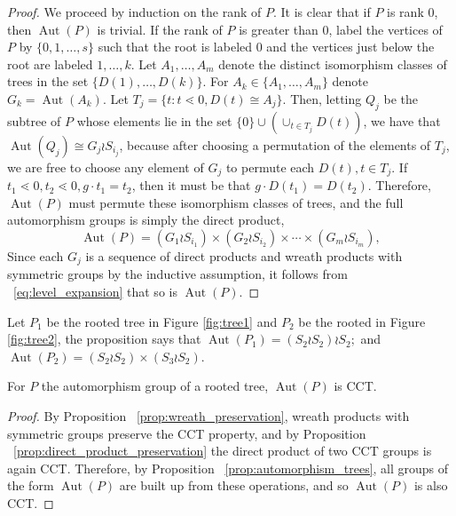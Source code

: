 \documentclass[smallextended]{svjour3}       %
\numberwithin{equation}{section}
\newcommand\Aut{\operatorname{Aut}}
\begin{document}
\begin{proof}
We proceed by induction on the rank of $P$.  It is clear that if $P$ is rank 0, then $\Aut(P)$ is trivial.  If the rank of $P$ is greater than 0, label the vertices of $P$ by $\{0,1,\ldots, s\}$ such that the root is labeled $0$ and the vertices just below the root are labeled $1, \ldots, k$. Let $A_1,\ldots, A_m$ denote the distinct isomorphism classes of trees in the set $\{D(1),\ldots, D(k)\}$. For $A_k \in \{A_1,\ldots,A_m\}$ denote $G_k = \Aut(A_k)$. 
Let $T_j = \{t\colon t\lessdot 0,D(t) \cong A_j\}$. Then, letting $Q_j$ be the subtree of $P$ whose elements lie in the set $\{0\} \cup (\cup_{t \in T_j} D(t))$, we have that $\Aut(Q_j) \cong G_j \wr S_{i_j}$, because after choosing a permutation of the elements of $T_j$, we are free to choose any element of $G_j$ to permute each $D(t),t \in T_j$. If $t_1 \lessdot 0,t_2 \lessdot 0,g \cdot t_1 = t_2$, then it must be that $g \cdot D(t_1) = D(t_2)$. Therefore, $\Aut(P)$ must permute these isomorphism classes of trees, and the full automorphism groups is simply the direct product, 
\begin{equation}
\label{eq:level_expansion}
\Aut(P) = (G_1 \wr S_{i_1}) \times (G_2 \wr S_{i_2}) \times \cdots \times (G_m\wr S_{i_m}),
\end{equation}
Since each $G_j$ is a sequence of direct products and wreath products with symmetric groups by the inductive assumption, it follows from ~\eqref{eq:level_expansion} that so is $\Aut(P)$.
\end{proof}

\begin{example}
Let $P_1$ be the rooted tree  in Figure \ref{fig:tree1} and $P_2$ be the rooted in Figure \ref{fig:tree2}, the proposition says that $\Aut (P_1) = (S_2 \wr S_2)\wr S_2;$ and $\Aut(P_2) = (S_2 \wr S_2) \times (S_3 \wr S_2) $. 
\end{example}

\begin{corollary}
\label{cor:tree_cct}
For $P$ the automorphism group of a rooted tree, $\Aut(P)$ is CCT.
\end{corollary}
\begin{proof}
By Proposition ~\ref{prop:wreath_preservation}, wreath products with symmetric groups preserve the CCT property, and by Proposition ~\ref{prop:direct_product_preservation} the direct product of two CCT groups is again CCT. Therefore, by Proposition ~\ref{prop:automorphism_trees}, all groups of the form $\Aut(P)$ are built up from these operations, and so $\Aut(P)$ is also CCT.
\end{proof}
\end{document}
